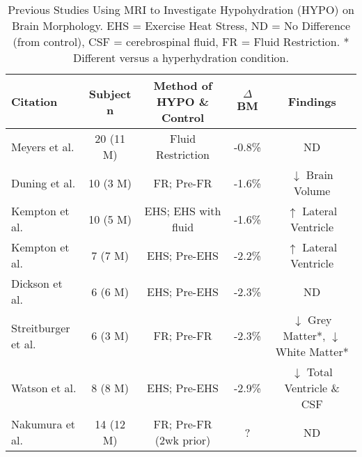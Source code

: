 \begin{table}
\caption{Previous Studies Using MRI to Investigate Hypohydration (HYPO) on Brain Morphology. EHS = Exercise Heat Stress, ND = No Difference (from control), CSF = cerebrospinal fluid, FR = Fluid Restriction. * Different versus a hyperhydration condition.}
\begin{center}

\begin{tabular}{lcccc} 
\hline
\footnotesize\textbf{Citation} & \footnotesize\textbf{Subject n} & \footnotesize\textbf{Method of HYPO \& Control} & \textbf{${\Delta}$ BM} & \footnotesize\textbf{Findings} \\
\hline

\footnotesize Meyers et al. \cite{meyers_does_2016} & \footnotesize 20 \scriptsize(11 M) & \footnotesize Fluid Restriction & \footnotesize -0.8\% & \footnotesize ND \\

\footnotesize Duning et al. \cite{duning_dehydration_2005} & \footnotesize 10 \scriptsize(3 M) & \footnotesize FR; Pre-FR & \footnotesize -1.6\% & \footnotesize ${\downarrow}$ Brain Volume \\

\footnotesize Kempton et al. \cite{kempton_dehydration_2011} & \footnotesize 10 \scriptsize(5 M) & \footnotesize EHS; EHS with fluid & \footnotesize -1.6\% & \footnotesize ${\uparrow}$ \footnotesize Lateral Ventricle \\

\footnotesize Kempton et al. \cite{kempton_effects_2009} & \footnotesize 7 \scriptsize(7 M) & \footnotesize EHS; Pre-EHS & \footnotesize -2.2\% & \footnotesize ${\uparrow}$ \footnotesize Lateral Ventricle \\

\footnotesize Dickson et al. \cite{dickson_effects_2005} & \footnotesize 6 \scriptsize(6 M) & \footnotesize EHS; Pre-EHS & \footnotesize -2.3\% & \footnotesize ND \\

\footnotesize Streitburger et al. \cite{streitburger_investigating_2012} & \footnotesize 6 \scriptsize(3 M) & \footnotesize FR; Pre-FR & \footnotesize -2.3\% & \footnotesize ${\downarrow}$ Grey Matter*, ${\downarrow}$ White Matter* \\

\footnotesize Watson et al. \cite{watson_effect_2010} & \footnotesize 8 \scriptsize(8 M) & \footnotesize EHS; Pre-EHS & \footnotesize -2.9\% & \footnotesize ${\downarrow}$ Total Ventricle \& CSF \\

\footnotesize Nakumura et al. \cite{nakamura_correlation_2014} & \footnotesize 14 \scriptsize(12 M) & \footnotesize FR; Pre-FR \scriptsize(2wk prior) & \footnotesize ? & \footnotesize ND \\	
\hline

\end{tabular}
\label{tbl:mri_deh}
\end{center}
\end{table}



